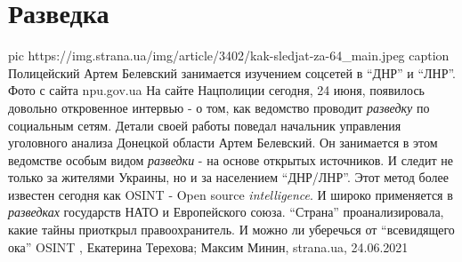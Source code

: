  
 
 
 
 
\chapter{Разведка}
\label{sec:slova.razvedka}

\ifcmt
  pic https://img.strana.ua/img/article/3402/kak-sledjat-za-64_main.jpeg
	caption Полицейский Артем Белевский занимается изучением соцсетей в \enquote{ДНР} и \enquote{ЛНР}. Фото с сайта npu.gov.ua 
\fi
На сайте Нацполиции сегодня, 24 июня, появилось довольно откровенное интервью -
о том, как ведомство проводит \emph{разведку} по социальным сетям.  Детали своей
работы поведал начальник управления уголовного анализа Донецкой области Артем
Белевский.  Он занимается в этом ведомстве особым видом \emph{разведки} - на основе
открытых источников.  И следит не только за жителями Украины, но и за
населением \enquote{ДНР/ЛНР}.  Этот метод более известен сегодня как OSINT - Open
source \emph{intelligence}. И широко применяется в \emph{разведках} государств НАТО и
Европейского союза.  \enquote{Страна} проанализировала, какие тайны приоткрыл
правоохранитель. И можно ли уберечься от \enquote{всевидящего ока}  OSINT
, 
Екатерина Терехова; Максим Минин, strana.ua, 24.06.2021

